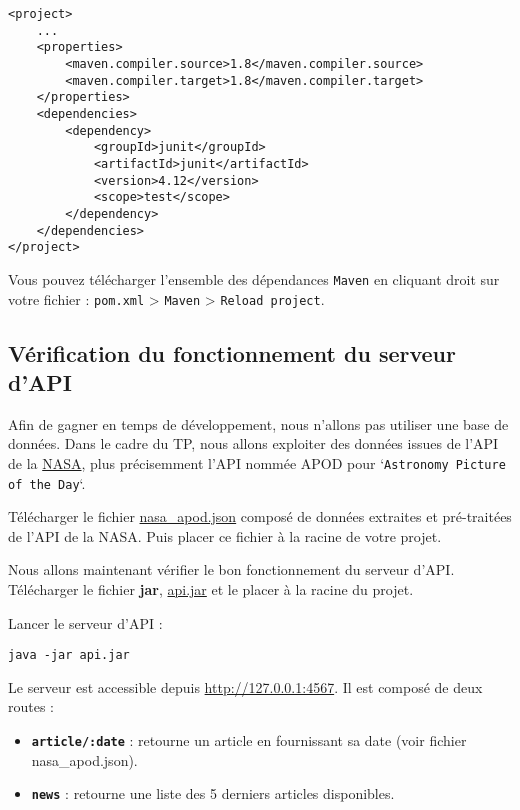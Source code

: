 \documentclass[11pt,a4paper,oneside]{article}
\begin{document}
\begin{lstlisting}[style=customXML]
<project>
	...
	<properties>
		<maven.compiler.source>1.8</maven.compiler.source>
		<maven.compiler.target>1.8</maven.compiler.target>
	</properties>
	<dependencies>
		<dependency>
			<groupId>junit</groupId>
			<artifactId>junit</artifactId>
			<version>4.12</version>
			<scope>test</scope>
		</dependency>
	</dependencies>
</project>
\end{lstlisting}

Vous pouvez télécharger l'ensemble des dépendances \texttt{Maven} en cliquant droit sur votre fichier : \texttt{pom.xml} > \texttt{Maven} > \texttt{Reload project}.

\subsection{Vérification du fonctionnement du serveur d'API}

\vspace{5mm}
Afin de gagner en temps de développement, nous n'allons pas utiliser une base de données. Dans le cadre du TP, nous allons exploiter des données issues de l'API de la \href{https://api.nasa.gov/}{NASA}, plus précisemment l'API nommée APOD pour `\texttt{Astronomy Picture of the Day}`.

\vspace{5mm}
Télécharger le fichier \href{https://jeromebuisine.fr/sources/git-teaching/courses/2021-2022/M1-Agility/tp2/resources/nasa_apod.json}{nasa\_apod.json} composé de données extraites et pré-traitées de l'API de la NASA. Puis placer ce fichier à la racine de votre projet.

Nous allons maintenant vérifier le bon fonctionnement du serveur d'API. Télécharger le fichier \textbf{jar}, \href{https://jeromebuisine.fr/sources/git-teaching/courses/2021-2022/M1-Agility/tp2/resources/api.jar}{api.jar} et le placer à la racine du projet.

\vspace{5mm}

Lancer le serveur d'API :
\begin{lstlisting}[style=custombash]
 java -jar api.jar
\end{lstlisting}

\vspace{5mm}
Le serveur est accessible depuis \href{http://127.0.0.1:4567}{http://127.0.0.1:4567}. Il est composé de deux routes :

\begin{itemize}
	\item \textbf{\texttt{article/:date}} : retourne un article en fournissant sa date (voir fichier nasa\_apod.json).
	\item \textbf{\texttt{news}} : retourne une liste des 5 derniers articles disponibles.
\end{itemize}
\end{document}

